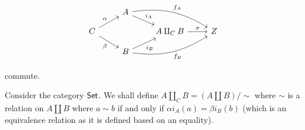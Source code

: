 \begin{solution}
\begin{itemize}
		\begin{equation*}
			\begin{tikzcd}[row sep=small]
				& 
				A
				\arrow[dr, "i_A"]
				\arrow[drr, bend left=20, "f_A"] & & \\
				C
				\arrow[ur, "\alpha"]
				\arrow[dr, "\beta"'] & &
				A \amalg_C B
				\arrow[r, "\sigma"] &
				Z \\
				&
				B 
				\arrow[ur, "i_B"']
				\arrow[urr, bend right=20, "f_B"'] & & \\
			\end{tikzcd}
		\end{equation*} commute.
		
		Consider the category $\mathsf{Set}$. We shall define $A \amalg_C B = (A \amalg B) / \sim$ where $\sim$ is a relation on $A \amalg B$ where $a \sim b$ if and only if $\alpha i_A(a) = \beta i_B(b)$ (which is an equivalence relation as it is defined based on an equality). \qedhere
	\end{itemize}
\end{solution}
